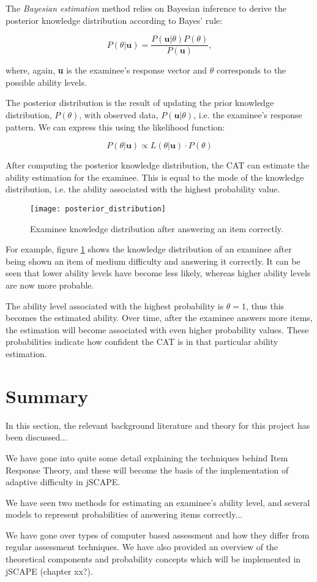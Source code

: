 The \textit{Bayesian estimation} method relies on Bayesian inference to derive the posterior knowledge distribution according to Bayes' rule:

$$P(\theta | \textbf{u}) = \dfrac{P(\textbf{u} | \theta)P(\theta)}{P(\textbf{u})} ,$$

where, again, \textbf{u} is the examinee's response vector and $\theta$ corresponds to the possible ability levels.\newline

The posterior distribution is the result of updating the prior knowledge distribution, $P(\theta)$, with observed data, $P(\textbf{u} | \theta)$, i.e. the examinee's response pattern. We can express this using the likelihood function:

$$P(\theta | \textbf{u}) \propto L(\theta | \textbf{u}) \cdot P(\theta)$$

After computing the posterior knowledge distribution, the CAT can estimate the ability estimation for the examinee. This is equal to the mode of the knowledge distribution, i.e. the ability associated with the highest probability value.

\begin{figure}[H]
\centering
\texttt{[image: posterior\_distribution]}
\caption{Examinee knowledge distribution after answering an item correctly.}
\label{fig:posterior_distribution}
\end{figure}

For example, figure \ref{fig:posterior_distribution} shows the knowledge distribution of an examinee after being shown an item of medium difficulty and answering it correctly. It can be seen that lower ability levels have become less likely, whereas higher ability levels are now more probable.\newline

The ability level associated with the highest probability is $\theta=1$, thus this becomes the estimated ability. Over time, after the examinee answers more items, the estimation will become associated with even higher probability values. These probabilities indicate how confident the CAT is in that particular ability estimation.

\section{Summary}
In this section, the relevant background literature and theory for this project has been discussed...\newline

We have gone into quite some detail explaining the techniques behind Item Response Theory, and these will become the basis of the implementation of adaptive difficulty in jSCAPE.\newline

We have seen two methods for estimating an examinee's ability level, and several models to represent probabilities of answering items correctly...\newline

We have gone over types of computer based assessment and how they differ from regular assessment techniques. We have also provided an overview of the theoretical components and probability concepts which will be implemented in jSCAPE (chapter xx?).
